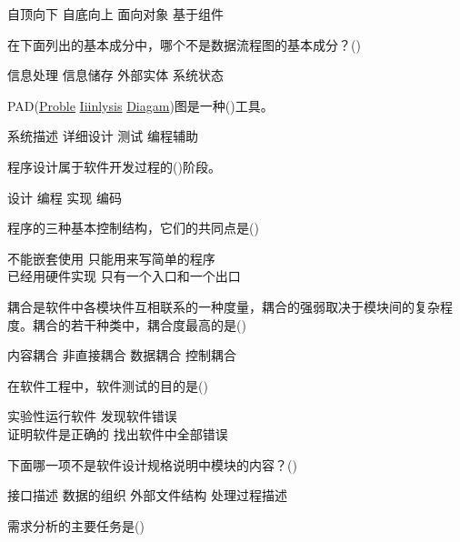 \documentclass{exam}
\begin{document}
\begin{questions}
	\begin{oneparchoices}
		\correctchoice 自顶向下
		\choice 自底向上
		\choice 面向对象
		\choice 基于组件
	\end{oneparchoices}
	\question 在下面列出的基本成分中，哪个不是数据流程图的基本成分？()\\
	\begin{oneparchoices}
		\choice 信息处理
		\choice 信息储存
		\choice 外部实体
		\correctchoice 系统状态
	\end{oneparchoices}
	\question PAD(\uline{Proble} \uline{Iiinlysis} \uline{Diagam})图是一种()工具。\\
	\begin{oneparchoices}
		\choice 系统描述
		\choice 详细设计
		\choice 测试
		\correctchoice 编程辅助
	\end{oneparchoices}
	\question 程序设计属于软件开发过程的()阶段。\\
	\begin{oneparchoices}
		\correctchoice 设计
		\choice 编程
		\choice 实现
		\choice 编码
	\end{oneparchoices}
	\question 程序的三种基本控制结构，它们的共同点是()\\
	\begin{oneparchoices}
		\choice 不能嵌套使用
		\choice 只能用来写简单的程序\\
		\choice 已经用硬件实现
		\correctchoice 只有一个入口和一个出口
	\end{oneparchoices}
	\question 耦合是软件中各模块件互相联系的一种度量，耦合的强弱取决于模块间的复杂程度。耦合的若干种类中，耦合度最高的是()\\
	\begin{oneparchoices}
		\correctchoice 内容耦合
		\choice 非直接耦合
		\choice 数据耦合
		\choice 控制耦合
	\end{oneparchoices}
	\question 在软件工程中，软件测试的目的是()\\
	\begin{oneparchoices}
		\choice 实验性运行软件
		\correctchoice 发现软件错误\\
		\choice 证明软件是正确的
		\choice 找出软件中全部错误
	\end{oneparchoices}
	\question 下面哪一项不是软件设计规格说明中模块的内容？()\\
	\begin{oneparchoices}
		\choice 接口描述
		\choice 数据的组织
		\correctchoice 外部文件结构
		\choice 处理过程描述
	\end{oneparchoices}
	\question 需求分析的主要任务是()\\

\end{questions}
\end{document}
